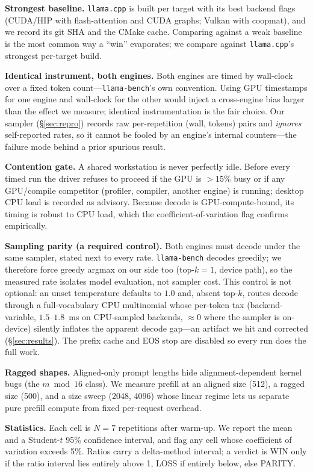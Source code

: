 \documentclass[11pt]{article}
\begin{document}
\textbf{Strongest baseline.} \texttt{llama.cpp} is built per target with its best backend
flags (CUDA/HIP with flash-attention and CUDA graphs; Vulkan with coopmat), and we record
its git SHA and the CMake cache. Comparing against a weak baseline is the most common way
a ``win'' evaporates; we compare against \texttt{llama.cpp}'s strongest per-target build.

\textbf{Identical instrument, both engines.} Both engines are timed by wall-clock over a
fixed token count---\texttt{llama-bench}'s own convention. Using GPU timestamps for one
engine and wall-clock for the other would inject a cross-engine bias larger than the effect
we measure; identical instrumentation is the fair choice. Our sampler
(\S\ref{sec:repro}) records raw per-repetition (wall, tokens) pairs and \emph{ignores}
self-reported rates, so it cannot be fooled by an engine's internal counters---the failure
mode behind a prior spurious result.

\textbf{Contention gate.} A shared workstation is never perfectly idle. Before every timed
run the driver refuses to proceed if the GPU is $>15\%$ busy or if any GPU/compile
competitor (profiler, compiler, another engine) is running; desktop CPU load is recorded as
advisory. Because decode is GPU-compute-bound, its timing is robust to CPU load, which the
coefficient-of-variation flag confirms empirically.

\textbf{Sampling parity (a required control).} Both engines must decode under the same
sampler, stated next to every rate. \texttt{llama-bench} decodes greedily; we therefore force
greedy argmax on our side too (top-$k{=}1$, device path), so the measured rate isolates
model evaluation, not sampler cost. This control is not optional: an unset temperature
defaults to $1.0$ and, absent top-$k$, routes decode through a full-vocabulary CPU multinomial
whose per-token tax (backend-variable, $1.5\text{--}1.8$~ms on CPU-sampled backends, $\approx 0$
where the sampler is on-device) silently inflates the apparent decode gap---an artifact we hit
and corrected (\S\ref{sec:results}). The prefix cache and EOS stop are disabled so every run
does the full work.

\textbf{Ragged shapes.} Aligned-only prompt lengths hide alignment-dependent kernel bugs
(the $m \bmod 16$ class). We measure prefill at an aligned size (512), a ragged size (500),
and a size sweep (2048, 4096) whose linear regime lets us separate pure prefill compute
from fixed per-request overhead.

\textbf{Statistics.} Each cell is $N{=}7$ repetitions after warm-up. We report the mean and
a Student-$t$ 95\% confidence interval, and flag any cell whose coefficient of variation
exceeds 5\%. Ratios carry a delta-method interval; a verdict is WIN only if the ratio
interval lies entirely above 1, LOSS if entirely below, else PARITY.
\end{document}

